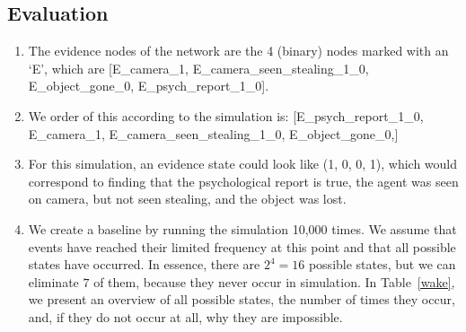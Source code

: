 \documentclass[12pt]{article}
\begin{document}
\subsection{Evaluation}
\begin{enumerate}
\item The evidence nodes of the network are the 4 (binary) nodes marked with an `E', which are [E\_camera\_1, E\_camera\_seen\_stealing\_1\_0, E\_object\_gone\_0, E\_psych\_report\_1\_0].
\item We order of this according to the simulation is:  [E\_psych\_report\_1\_0, E\_camera\_1,  E\_camera\_seen\_stealing\_1\_0, E\_object\_gone\_0,]
\item For this simulation, an evidence state could look like (1, 0, 0, 1), which would correspond to finding that the psychological report is true, the agent was seen on camera, but not seen stealing, and the object was lost.

\item We create a baseline by running the simulation 10,000 times. We assume that events have reached their limited frequency at this point and that all possible states have occurred. In essence, there are $2^4 = 16$ possible states, but we can eliminate $7$ of them, because they never occur in simulation. In Table~\ref{wake}, we present an overview of all possible states, the number of times they occur, and, if they do not occur at all, why they are impossible.


\end{enumerate}
\end{document}
